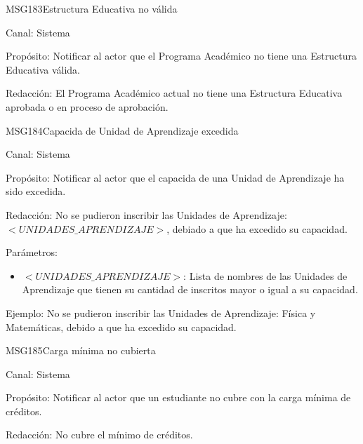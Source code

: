 \begin{mensaje}{MSG183}{Estructura Educativa no válida}
	\item[Canal:] Sistema
	\item[Propósito:] Notificar al actor que el Programa Académico no tiene una Estructura Educativa válida.
	\item[Redacción:] El Programa Académico actual no tiene una Estructura Educativa aprobada o en proceso de aprobación.
\end{mensaje}

\begin{mensaje}{MSG184}{Capacida de Unidad de Aprendizaje excedida}
	\item[Canal:] Sistema
	\item[Propósito:] Notificar al actor que el capacida de una Unidad de Aprendizaje ha sido excedida.
	\item[Redacción:] No se pudieron inscribir las Unidades de Aprendizaje: $<UNIDADES\_APRENDIZAJE>$, debiado a que ha excedido su capacidad.
		\item[Parámetros:] 
		\begin{itemize}
			\item $<UNIDADES\_APRENDIZAJE>$: Lista de nombres de las Unidades de Aprendizaje que tienen su cantidad de inscritos mayor o igual a su capacidad.
		\end{itemize}
		\item[Ejemplo:] No se pudieron inscribir las Unidades de Aprendizaje: Física y Matemáticas, debido a que ha excedido su capacidad.
\end{mensaje}

\begin{mensaje}{MSG185}{Carga mínima no cubierta}
	\item[Canal:] Sistema
	\item[Propósito:] Notificar al actor que un estudiante no cubre con la carga mínima de créditos.
	\item[Redacción:] No cubre el mínimo de créditos.
\end{mensaje}

